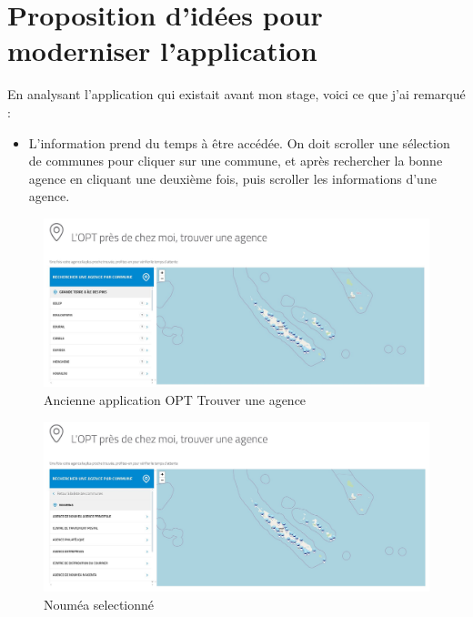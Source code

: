 \documentclass[12pt,a4paper]{report}
\begin{document}
\section{Proposition d'idées pour moderniser l'application}
En analysant l'application qui existait avant mon stage, voici ce que j'ai remarqué :
\begin{itemize}
    \item L'information prend du temps à être accédée. On doit scroller une sélection de communes pour cliquer sur une commune, et après rechercher la bonne agence en cliquant une deuxième fois, puis scroller les informations d'une agence.
\end{itemize}
\begin{figure}[h] %
    \centering
    \includegraphics[width=1\textwidth]{ressources_rapport/ancien_app_opt.JPG}
    \caption{Ancienne application OPT Trouver une agence}
\end{figure}
\vspace{1cm}

\begin{figure}[h] %
    \centering
    \includegraphics[width=1\textwidth]{ressources_rapport/ancien_app_opt_noumea.JPG}
    \caption{Nouméa selectionné}
\end{figure}
\vspace{1cm}
\end{document}
